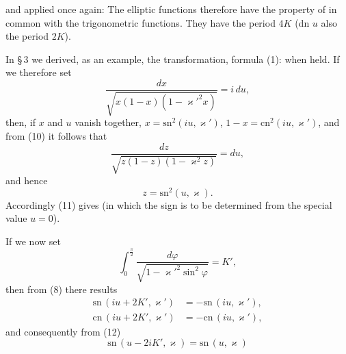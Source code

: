 
and applied once again:
The elliptic functions therefore have the property of  in common with the trigonometric functions. They have the period $4K$ (dn $u$ also the period $2K$).

In §\,3 we derived, as an example, the transformation, formula (1):
when
held. If we therefore set
\[
\frac{dx}{\sqrt{x(1-x)(1-\varkappa'^2x)}} = i\,du,
\]
then, if $x$ and $u$ vanish together, $x = \mathrm{sn}^2(iu,\varkappa')$, $1-x = \mathrm{cn}^2(iu,\varkappa')$, and from (10) it follows that
\[
\frac{dz}{\sqrt{z(1-z)(1-\varkappa^2z)}} = du,
\]
and hence
\[
z = \mathrm{sn}^2(u,\varkappa).
\]
Accordingly (11) gives
(in which the sign is to be determined from the special value $u=0$).

If we now set
\[
\int_0^{\frac{\pi}{2}} \frac{d\varphi}{\sqrt{1-\varkappa'^2\sin^2\varphi}} = K',
\]
then from (8) there results
\[
\begin{aligned}
\mathrm{sn}\,(iu+2K',\varkappa') &= -\mathrm{sn}\,(iu,\varkappa'),\\
\mathrm{cn}\,(iu+2K',\varkappa') &= -\mathrm{cn}\,(iu,\varkappa'),
\end{aligned}
\]
and consequently from (12)
\[
\mathrm{sn}\,(u-2iK',\varkappa) = \mathrm{sn}\,(u,\varkappa)
\]
